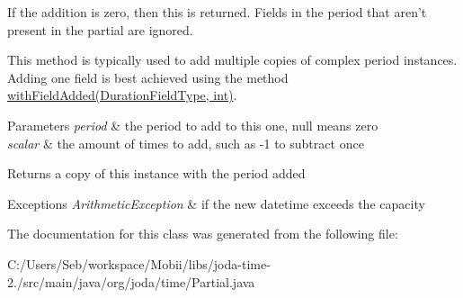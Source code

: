 If the addition is zero, then {\ttfamily this} is returned. Fields in the period that aren't present in the partial are ignored. 

This method is typically used to add multiple copies of complex period instances. Adding one field is best achieved using the method \hyperlink{classorg_1_1joda_1_1time_1_1_partial_a9c34eca1072f085c9cd2951ad0bb0b69}{with\-Field\-Added(\-Duration\-Field\-Type, int)}.


\begin{DoxyParams}{Parameters}
{\em period} & the period to add to this one, null means zero \\
\hline
{\em scalar} & the amount of times to add, such as -\/1 to subtract once \\
\hline
\end{DoxyParams}
\begin{DoxyReturn}{Returns}
a copy of this instance with the period added 
\end{DoxyReturn}

\begin{DoxyExceptions}{Exceptions}
{\em Arithmetic\-Exception} & if the new datetime exceeds the capacity \\
\hline
\end{DoxyExceptions}


The documentation for this class was generated from the following file\-:\begin{DoxyCompactItemize}
\item 
C\-:/\-Users/\-Seb/workspace/\-Mobii/libs/joda-\/time-\/2./src/main/java/org/joda/time/Partial.\-java\end{DoxyCompactItemize}
